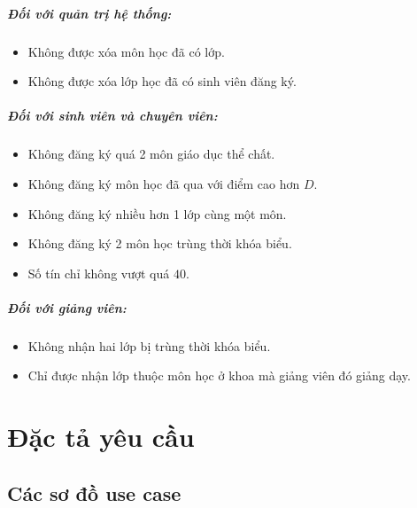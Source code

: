 \documentclass[12pt]{book}
\begin{document}
    \paragraph{Đối với quản trị hệ thống:}
    \begin{itemize}
      \item Không được xóa môn học đã có lớp.
      \item Không được xóa lớp học đã có sinh viên đăng ký.
    \end{itemize}

    \paragraph{Đối với sinh viên và chuyên viên:}
    \begin{itemize}
      \item Không đăng ký quá 2 môn giáo dục thể chất.
      \item Không đăng ký môn học đã qua với điểm cao hơn $ D $.
      \item Không đăng ký nhiều hơn 1 lớp cùng một môn.
      \item Không đăng ký 2 môn học trùng thời khóa biểu.
      \item Số tín chỉ không vượt quá $ 40 $.
    \end{itemize}

    \paragraph{Đối với giảng viên:}
    \begin{itemize}
      \item Không nhận hai lớp bị trùng thời khóa biểu.
      \item Chỉ được nhận lớp thuộc môn học ở khoa mà giảng viên đó giảng dạy.
    \end{itemize}

\chapter{Đặc tả yêu cầu}

  \section{Các sơ đồ use case}
\end{document}

